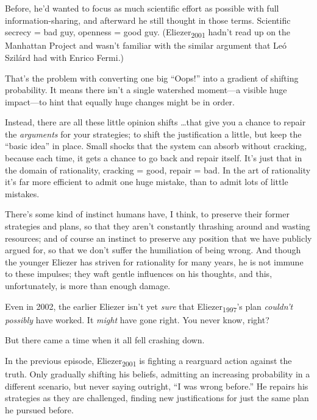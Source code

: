 {
 Before, he'd wanted to focus as much scientific
effort as possible with full information-sharing, and afterward he
still thought in those terms. Scientific secrecy = bad guy, openness =
good guy. (Eliezer\textsubscript{2001} hadn't read up
on the Manhattan Project and wasn't familiar with the
similar argument that Leó Szilárd had with Enrico Fermi.)}

{
 That's the problem with converting one big
``Oops!'' into a gradient of
shifting probability. It means there isn't a single
watershed moment---a visible huge impact---to hint that equally huge
changes might be in order.}

{
 Instead, there are all these little opinion shifts \ldots that give
you a chance to repair the \textit{arguments} for your strategies; to
shift the justification a little, but keep the ``basic
idea'' in place. Small shocks that the system can
absorb without cracking, because each time, it gets a chance to go back
and repair itself. It's just that in the domain of
rationality, cracking = good, repair = bad. In the art of rationality
it's far more efficient to admit one huge mistake, than
to admit lots of little mistakes.}

{
 There's some kind of instinct humans have, I
think, to preserve their former strategies and plans, so that they
aren't constantly thrashing around and wasting
resources; and of course an instinct to preserve any position that we
have publicly argued for, so that we don't suffer the
humiliation of being wrong. And though the younger Eliezer has striven
for rationality for many years, he is not immune to these impulses;
they waft gentle influences on his thoughts, and this, unfortunately,
is more than enough damage.}

{
 Even in 2002, the earlier Eliezer isn't yet
\textit{sure} that Eliezer\textsubscript{1997}'s plan
\textit{couldn't possibly} have worked. It
\textit{might} have gone right. You never know, right?}

{
 But there came a time when it all fell crashing down.}

\myendsectiontext


\bigskip


{
 In the previous episode, Eliezer\textsubscript{2001} is fighting a
rearguard action against the truth. Only gradually shifting his
beliefs, admitting an increasing probability in a different scenario,
but never saying outright, ``I was wrong
before.'' He repairs his strategies as they are
challenged, finding new justifications for just the same plan he
pursued before. }

